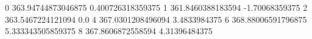 0 363.94744873046875 0.400726318359375
1 361.8460388183594 -1.70068359375
2 363.5467224121094 0.0
4 367.0301208496094 3.4833984375
6 368.88006591796875 5.333343505859375
8 367.8606872558594 4.31396484375
